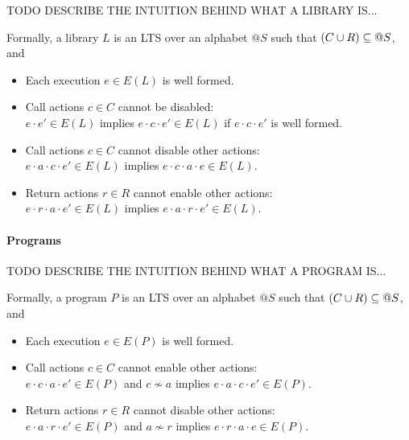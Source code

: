 TODO DESCRIBE THE INTUITION BEHIND WHAT A LIBRARY IS...

Formally, a library $L$ is an LTS over an alphabet $@S$ such that $(C \cup R)
\subseteq @S$, and
\begin{itemize}

  \item Each execution $e \in E(L)$ is well formed.

  \item Call actions $c \in C$ cannot be disabled: \\
  $e \cdot e' \in E(L)$ implies $e \cdot c \cdot e' \in E(L)$
  if $e \cdot c \cdot e'$ is well formed.
  
  \item Call actions $c \in C$ cannot disable other actions: \\
  $e \cdot a \cdot c \cdot e' \in E(L)$ implies $e \cdot c \cdot a \cdot e \in E(L)$.
  
  \item Return actions $r \in R$ cannot enable other actions: \\
  $e \cdot r \cdot a \cdot e' \in E(L)$ implies $e \cdot a \cdot r \cdot e' \in E(L)$.

\end{itemize}

\paragraph{Programs}

TODO DESCRIBE THE INTUITION BEHIND WHAT A PROGRAM IS...

Formally, a program $P$ is an LTS over an alphabet $@S$ such that $(C \cup R)
\subseteq @S$, and
\begin{itemize}
  
  \item Each execution $e \in E(P)$ is well formed.
  
	\item Call actions $c \in C$ cannot enable other actions: \\
  $e \cdot c \cdot a \cdot e' \in E(P)$ and $c \not\sim a$
  implies $e \cdot a \cdot c \cdot e' \in E(P)$.
  
  \item Return actions $r \in R$ cannot disable other actions: \\
  $e \cdot a \cdot r \cdot e' \in E(P)$ and $a \not\sim r$
  implies $e \cdot r \cdot a \cdot e \in E(P)$.

\end{itemize}

